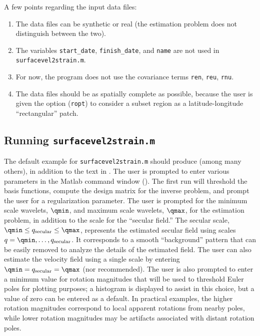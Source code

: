 \documentclass[11pt,titlepage,fleqn]{article}
\begin{document}
A few points regarding the input data files:
%
\begin{enumerate}
\item The data files can be synthetic or real (the estimation problem does not distinguish between the two).
\item The variables \verb+start_date+, \verb+finish_date+, and \verb+name+ are not used in \verb+surfacevel2strain.m+.
\item For now, the program does not use the covariance terms \verb+ren+, \verb+reu+, \verb+rnu+.
\item The data files should be as spatially complete as possible, because the user is given the option (\verb+ropt+) to consider a subset region as a latitude-longitude ``rectangular'' patch.
\end{enumerate}


\subsection{Running {\tt surfacevel2strain.m}}

The default example for \verb+surfacevel2strain.m+ should produce  (among many others), in addition to the text in . The user is prompted to enter various parameters in the Matlab command window (). The first run will threshold the basis functions, compute the design matrix for the inverse problem, and prompt the user for a regularization parameter. The user is prompted for the minimum scale wavelets, $\qmin$, and maximum scale wavelets, $\qmax$, for the estimation problem, in addition to the scale for the ``secular field.'' The secular scale, $\qmin \le q_{\rm secular} \le \qmax$, represents the estimated secular field using scales $q = \qmin, \ldots, q_{\rm secular}$. It corresponds to a smooth ``background'' pattern that can be easily removed to analyze the details of the estimated field. The user can also estimate the velocity field using a single scale by entering $\qmin = q_{\rm secular} = \qmax$ (nor recommended). The user is also prompted to enter a minimum value for rotation magnitudes that will be used to threshold Euler poles for plotting purposes; a histogram is displayed to assist in this choice, but a value of zero can be entered as a default. In practical examples, the higher rotation magnitudes correspond to local apparent rotations from nearby poles, while lower rotation magnitudes may be artifacts associated with distant rotation poles.
\end{document}

